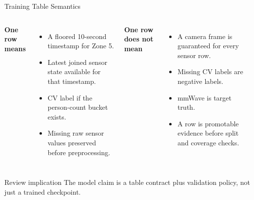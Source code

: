 \documentclass[aspectratio=169]{beamer}
\begin{document}
\begin{frame}[shrink=4]{Training Table Semantics}
\begin{columns}[T,onlytextwidth]
\textbf{One row means}
\begin{itemize}
  \item A floored 10-second timestamp for Zone 5.
  \item Latest joined sensor state available for that timestamp.
  \item CV label if the person-count bucket exists.
  \item Missing raw sensor values preserved before preprocessing.
\end{itemize}

\textbf{One row does not mean}
\begin{itemize}
  \item A camera frame is guaranteed for every sensor row.
  \item Missing CV labels are negative labels.
  \item mmWave is target truth.
  \item A row is promotable evidence before split and coverage checks.
\end{itemize}
\end{columns}
\tightsep
\begin{block}{Review implication}
\small The model claim is a table contract plus validation policy, not just a trained checkpoint.
\end{block}
\end{frame}
\end{document}
